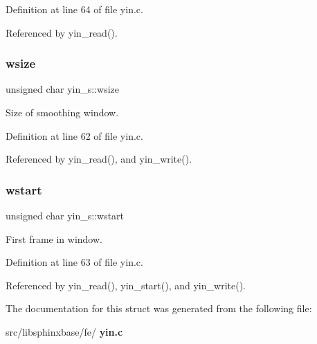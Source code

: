 Definition at line 64 of file yin.\+c.



Referenced by yin\+\_\+read().

\mbox{\label{structyin__s_a024d8e9d70f94a7f62457154fb5a4b03}} 
\subsubsection{wsize}
{\footnotesize\ttfamily unsigned char yin\+\_\+s\+::wsize}



Size of smoothing window. 



Definition at line 62 of file yin.\+c.



Referenced by yin\+\_\+read(), and yin\+\_\+write().

\mbox{\label{structyin__s_a18481851da6db4df2a469b80c2c5704e}} 
\subsubsection{wstart}
{\footnotesize\ttfamily unsigned char yin\+\_\+s\+::wstart}



First frame in window. 



Definition at line 63 of file yin.\+c.



Referenced by yin\+\_\+read(), yin\+\_\+start(), and yin\+\_\+write().



The documentation for this struct was generated from the following file\+:\begin{DoxyCompactItemize}
\item 
src/libsphinxbase/fe/\textbf{ yin.\+c}\end{DoxyCompactItemize}
